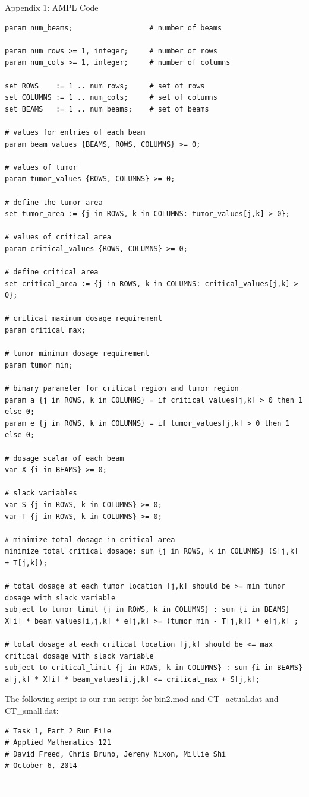 \documentclass[12pt]{article}
\makeatletter
\newenvironment{task}{\@startsection
       {section}{1}
       {0.4em}{-.5ex plus -1ex minus -.2ex}{.5ex plus .2ex}
       {\pagebreak[3]\large\bf\noindent{Task}}}
       {\nopagebreak[3]\vspace{3ex}\begin{center}\rule{1\linewidth}{.3pt}\end{center}}
\makeatother
\begin{document}
\begin{task}{Appendix 1: AMPL Code}
\begin{enumerate}
\begin{lstlisting}
param num_beams;                  # number of beams

param num_rows >= 1, integer;     # number of rows
param num_cols >= 1, integer;     # number of columns 

set ROWS    := 1 .. num_rows;	  # set of rows
set COLUMNS := 1 .. num_cols;	  # set of columns
set BEAMS   := 1 .. num_beams;    # set of beams

# values for entries of each beam
param beam_values {BEAMS, ROWS, COLUMNS} >= 0; 

# values of tumor
param tumor_values {ROWS, COLUMNS} >= 0; 

# define the tumor area 
set tumor_area := {j in ROWS, k in COLUMNS: tumor_values[j,k] > 0};

# values of critical area
param critical_values {ROWS, COLUMNS} >= 0; 

# define critical area 
set critical_area := {j in ROWS, k in COLUMNS: critical_values[j,k] > 0};

# critical maximum dosage requirement
param critical_max;

# tumor minimum dosage requirement
param tumor_min;

# binary parameter for critical region and tumor region
param a {j in ROWS, k in COLUMNS} = if critical_values[j,k] > 0 then 1 else 0;
param e {j in ROWS, k in COLUMNS} = if tumor_values[j,k] > 0 then 1 else 0;

# dosage scalar of each beam
var X {i in BEAMS} >= 0;

# slack variables
var S {j in ROWS, k in COLUMNS} >= 0;
var T {j in ROWS, k in COLUMNS} >= 0;

# minimize total dosage in critical area
minimize total_critical_dosage: sum {j in ROWS, k in COLUMNS} (S[j,k] + T[j,k]);

# total dosage at each tumor location [j,k] should be >= min tumor dosage with slack variable
subject to tumor_limit {j in ROWS, k in COLUMNS} : sum {i in BEAMS} X[i] * beam_values[i,j,k] * e[j,k] >= (tumor_min - T[j,k]) * e[j,k] ;

# total dosage at each critical location [j,k] should be <= max critical dosage with slack variable
subject to critical_limit {j in ROWS, k in COLUMNS} : sum {i in BEAMS} a[j,k] * X[i] * beam_values[i,j,k] <= critical_max + S[j,k];
\end{lstlisting}

The following script is our run script for bin2.mod and CT\_actual.dat and CT\_small.dat:
\begin{lstlisting}
# Task 1, Part 2 Run File
# Applied Mathematics 121
# David Freed, Chris Bruno, Jeremy Nixon, Millie Shi
# October 6, 2014


\end{lstlisting}
\end{enumerate}
\end{task}
\end{document}

